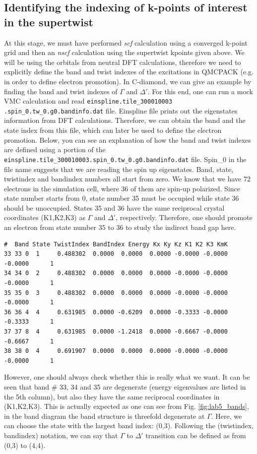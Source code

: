 \subsection{Identifying the indexing of k-points of interest in the supertwist}
At this stage, we must have performed \textit{scf} calculation using a converged k-point grid and then an \textit{nscf} calculation using the supertwist kpoints given above. 
We will be using the orbitals from neutral DFT calculations, therefore we need to explicitly define the band and twist indexes of the excitations in QMCPACK (e.g. in order to define electron promotion).
In C-diamond, we can give an example by finding the band and twist indexes of $\Gamma$ and $\Delta'$. 
For this end, one can run a mock VMC calculation and read \texttt{einspline.tile\_300010003} \texttt{.spin\_0.tw\_0.g0.bandinfo.dat} file. Einspline file prints out the eigenstates information from DFT calculations. 
Therefore, we can obtain the band and the state index from this file, which can later be used to define the electron promotion. 
Below, you can see an explanation of how the band and twist indexes are defined using a portion of the \texttt{einspline.tile\_300010003.spin\_0.tw\_0.g0.bandinfo.dat} file. 
Spin\_0 in the file name suggests that we are reading the spin up eigenstates. Band, state, twistindex and bandindex numbers all start from zero. We know that we have 72 electrons in the simulation cell, where 36 of them are spin-up polarized. 
Since state number starts from 0, state number 35 must be occupied while state 36 should be unoccupied. 
States 35 and 36 have the same reciprocal crystal coordinates (K1,K2,K3) as $\Gamma$ and $\Delta'$, respectively. 
Therefore, one should promote an electron from state number 35 to 36 to study the indirect band gap here. 
\begin{lstlisting}
#  Band State TwistIndex BandIndex Energy Kx Ky Kz K1 K2 K3 KmK
33 33 0  1     0.488302  0.0000  0.0000  0.0000 -0.0000 -0.0000 -0.0000      1
34 34 0  2     0.488302  0.0000  0.0000  0.0000 -0.0000 -0.0000 -0.0000      1
35 35 0  3     0.488302  0.0000  0.0000  0.0000 -0.0000 -0.0000 -0.0000      1
36 36 4  4     0.631985  0.0000 -0.6209  0.0000 -0.3333 -0.0000 -0.3333      1
37 37 8  4     0.631985  0.0000 -1.2418  0.0000 -0.6667 -0.0000 -0.6667      1
38 38 0  4     0.691907  0.0000  0.0000  0.0000 -0.0000 -0.0000 -0.0000      1
\end{lstlisting}
However, one should always check whether this is really what we want. 
It can be seen  that band \# 33, 34 and 35 are degenerate (energy eigenvalues are listed in the 5th column), but also they have the same reciprocal coordinates in (K1,K2,K3). 
This is actually expected as one can see from Fig. \ref{fig:lab5_bands}, in the band diagram the band structure is threefold degenerate at $\Gamma$.  
Here, we can choose the state with the largest band index: (0,3). 
Following the (twistindex, bandindex) notation, we can say that $\Gamma$ to $\Delta'$ transition can be defined as from (0,3) to (4,4). 

